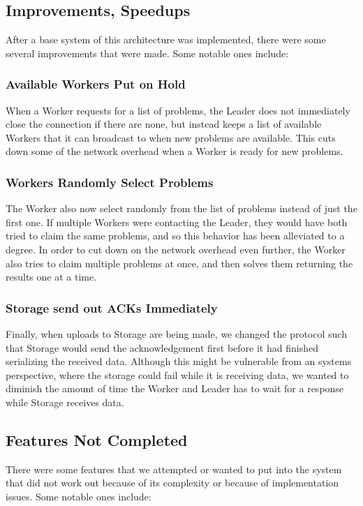\documentclass[12pt]{article}
\begin{document}
\subsection{Improvements, Speedups}
After a base system of this architecture was implemented, there were some several improvements that were made. Some notable ones include:

\subsubsection{Available Workers Put on Hold}
When a Worker requests for a list of problems, the Leader does not immediately close the connection if there are none, but instead keeps a list of available Workers that it can broadcast to when new problems are available. This cuts down some of the network overhead when a Worker is ready for new problems. 

\subsubsection{Workers Randomly Select Problems}
The Worker also now select randomly from the list of problems instead of just the first one. If multiple Workers were contacting the Leader, they would have both tried to claim the same problems, and so this behavior has been alleviated to a degree. In order to cut down on the network overhead even further, the Worker also tries to claim multiple problems at once, and then solves them returning the results one at a time.

\subsubsection{Storage send out ACKs Immediately}
Finally, when uploads to Storage are being made, we changed the protocol such that Storage would send the acknowledgement first before it had finished serializing the received data. Although this might be vulnerable from an systems perspective, where the storage could fail while it is receiving data, we wanted to diminish the amount of time the Worker and Leader has to wait for a response while Storage receives data.


\subsection{Features Not Completed}
There were some features that we attempted or wanted to put into the system that did not work out because of its complexity or because of implementation issues. Some notable ones include:
\end{document}
